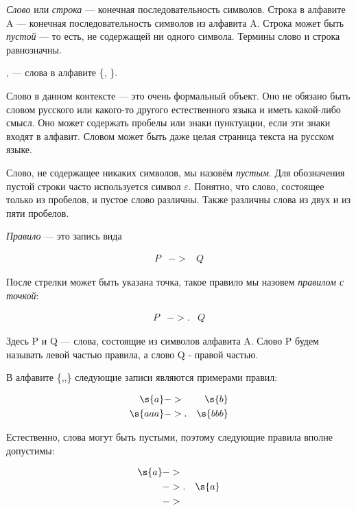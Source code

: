 \begin{definition}
\emph{Слово} или \emph{строка} --- конечная последовательность символов. Строка в 
алфавите A --- конечная последовательность символов из алфавита A. Строка может
быть \emph{пустой} --- то есть, не содержащей ни одного символа. 
Термины слово и строка равнозначны. 
\end{definition}

\begin{example}
,  --- слова в алфавите \{,
\}. 
\end{example}

Слово в данном контексте --- это очень формальный объект. Оно не обязано быть 
словом русского или какого-то другого естественного языка и иметь какой-либо 
смысл. Оно может содержать пробелы или знаки пунктуации, если эти знаки 
входят в алфавит. Словом может быть даже целая страница текста на русском 
языке. 

Слово, не содержащее никаких символов, мы назовём \emph{пустым}.
Для обозначения пустой строки часто используется символ $\varepsilon$.
Понятно, что слово, состоящее только из пробелов, и пустое слово различны.
Также различны слова из двух и из пяти пробелов.

\begin{definition}\emph{Правило} --- это запись вида 
\begin{bnf}\begin{eqnarray*}P &->& Q \end{eqnarray*}\end{bnf}После
стрелки может быть указана точка, такое правило мы назовем 
\emph{правилом с точкой}:
\begin{bnf}\begin{eqnarray*}P &->.& Q \end{eqnarray*}\end{bnf}Здесь 
P и Q --- слова, состоящие из символов алфавита A. 
Слово P будем называть левой частью правила, а слово Q - правой частью.
\end{definition}

\begin{example}В алфавите \{,,\} следующие записи являются примерами правил: 
\begin{bnf}\begin{eqnarray*}
  \s{a} &->& \s{b}\\
  \s{aaa} &->.& \s{bbb}
\end{eqnarray*}
\end{bnf}Естественно, слова могут быть пустыми, поэтому следующие правила вполне допустимы:
\begin{bnf}\begin{eqnarray*}
 \s{a} &->&\\
 &->.& \s{a}\\
 &->&
\end{eqnarray*}\end{bnf}  
\end{example}


